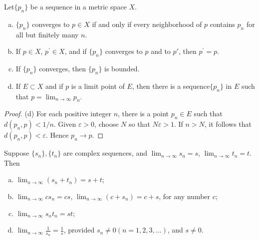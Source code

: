 
\begin{thm}\label{thm:3.2 convergence sequence in metric space}
    Let$\{p_n\}$ be a sequence in a metric space $X$.
    \begin{enumerate}[(a)]
        \item $\{p_n\}$ converges to $p \in X$ if and only if every neighborhood of $p$ contains $p_n$ for all but finitely many $n$.
        \item If $p\in X$, $p^\prime \in X$, and if $\{p_n\}$ converges to $p$ and to $p'$, then $p^\prime =p$.
        \item If $\{p_n\}$ converges, then $\{p_n\}$ is bounded.
        \item If $E \subset X$ and if $p$ is a limit point of $E$, then there is a sequence$\{p_n\}$ in $E$ such that $p = \lim_{n \to \infty} p_n$.
    \end{enumerate}
\end{thm}

\begin{proof}
    (d) For each positive integer $n$, there is a point $p_n \in E$ such that $d(p_n,p) <1/n$. Given $\varepsilon > 0$, choose $N$ so that $N \varepsilon >1$. If $n>N$, it follows that $d(p_n, p) <\varepsilon$. Hence $p_n \rightarrow p$.
\end{proof}

\begin{thm}\label{thm:3.3}
    Suppose $\{s_n\}, \{t_n\}$ are complex sequences, and 
    $\lim_{n \to \infty} s_n = s$,
    $\lim_{n \to \infty} t_n = t$.
    Then
    \begin{enumerate}[(a)]
        \item $\lim_{n \to \infty} (s_n + t_n) = s + t$;
        \item $\lim_{n \to \infty} c s_n = cs$, $\lim_{n \to \infty} (c + s_n) = c + s$, for any number $c$;
        \item $\lim_{n \to \infty} s_n t_n = st$;
        \item $\lim_{n \to \infty} \frac{1}{s_n} = \frac{1}{s}$, provided $s_n \neq 0(n = 1,2,3,\dots)$, and $s \neq 0$.
    \end{enumerate}
\end{thm}

